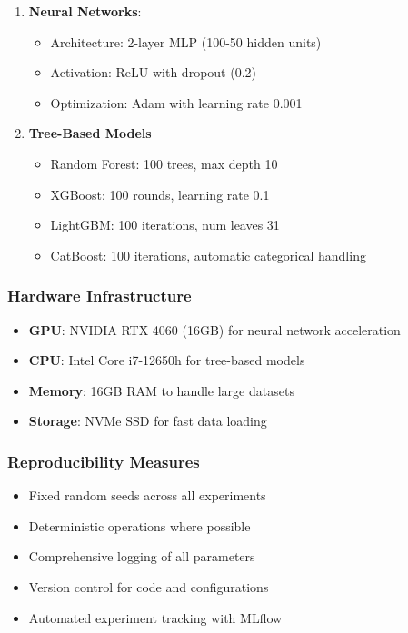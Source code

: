 \documentclass{ieeeaccess}
\theoremstyle{definition}
\begin{document}
\begin{enumerate}
    \item \textbf{Neural Networks}:
    \begin{itemize}
        \item Architecture: 2-layer MLP (100-50 hidden units)
        \item Activation: ReLU with dropout (0.2)
        \item Optimization: Adam with learning rate 0.001
    \end{itemize}
    \item \textbf{Tree-Based Models}
    \begin{itemize}
        \item Random Forest: 100 trees, max depth 10
        \item XGBoost: 100 rounds, learning rate 0.1
        \item LightGBM: 100 iterations, num leaves 31
        \item CatBoost: 100 iterations, automatic categorical handling
    \end{itemize}
\end{enumerate}

\subsubsection{Hardware Infrastructure}
\begin{itemize}
\item \textbf{GPU}: NVIDIA RTX 4060 (16GB) for neural network acceleration
\item \textbf{CPU}: Intel Core i7-12650h for tree-based models
\item \textbf{Memory}: 16GB RAM to handle large datasets
\item \textbf{Storage}: NVMe SSD for fast data loading
\end{itemize}

\subsubsection{Reproducibility Measures}
\begin{itemize}
\item Fixed random seeds across all experiments
\item Deterministic operations where possible
\item Comprehensive logging of all parameters
\item Version control for code and configurations
\item Automated experiment tracking with MLflow
\end{itemize}
\end{document}
